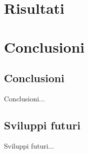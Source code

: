 \documentclass[12pt,italian]{report}
\begin{document}
% 
% 

\chapter{Risultati}
\label{chap:risultati}


% 
% 

\chapter{Conclusioni}
\label{cap6}

\section{Conclusioni}

Conclusioni...

\section{Sviluppi futuri}

Sviluppi futuri...



%
%



\end{document}
